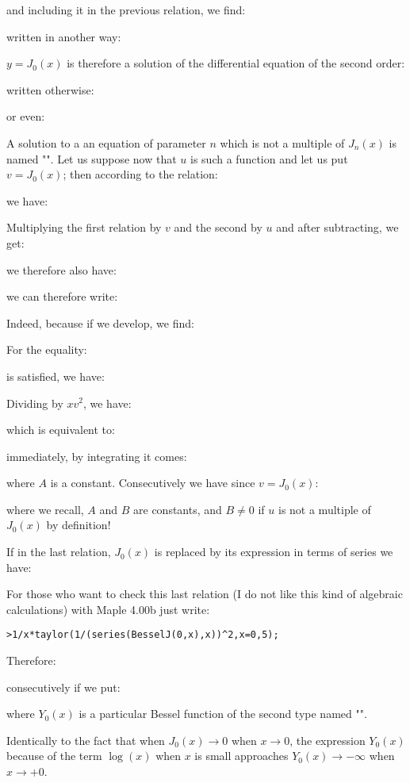 	and including it in the previous relation, we find:
	
	written in another way:
	
	$y=J_0(x)$ is therefore a solution of the differential equation of the second order:
	
	written otherwise:
	
	or even:
	
	A solution to a an equation of parameter $n$ which is not a multiple of $J_n(x)$ is named "". Let us suppose now that $u$ is such a function and let us put $v=J_0(x)$; then according to the relation:
	
	we have:
	
	Multiplying the first relation by $v$ and the second by $u$ and after subtracting, we get:
	
	we therefore also have:
	
	we can therefore write:
	
	Indeed, because if we develop, we find:
	
	For the equality:
	
	is satisfied, we have:
	
	Dividing by $xv^2$, we have:
	
	which is equivalent to:
	
	immediately, by integrating it comes:
	
	where $A$ is a constant. Consecutively we have since $v=J_0(x)$:
	
	where we recall, $A$ and $B$ are constants, and $B\neq 0$ if $u$ is not a multiple of $J_0(x)$ by definition!
	
	If in the last relation, $J_0(x)$ is replaced by its expression in terms of series we have:
	
		For those who want to check this last relation (I do not like this kind of algebraic calculations) with Maple 4.00b just write:
	
	\texttt{>1/x*taylor(1/(series(BesselJ(0,x),x))\string^2,x=0,5);}
	
	Therefore:
	
	consecutively if we put:
	
	where $Y_0(x)$ is a particular Bessel function of the second type named "".

	Identically to the fact that when $J_0(x)\rightarrow 0$ when $x \rightarrow 0$, the expression $Y_0(x)$ because of the term $\log(x)$ when $x$ is small approaches $Y_0(x) \rightarrow -\infty$ when $x\rightarrow +0$.
	
